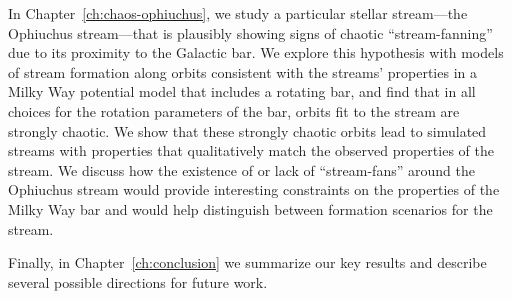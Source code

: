 In Chapter~\ref{ch:chaos-ophiuchus}, we study a particular stellar stream---the
Ophiuchus stream---that is plausibly showing signs of chaotic ``stream-fanning''
due to its proximity to the Galactic bar. We explore this hypothesis with models
of stream formation along orbits consistent with the streams' properties in a
Milky Way potential model that includes a rotating bar, and find that in all
choices for the rotation parameters of the bar, orbits fit to the stream are
strongly chaotic. We show that these strongly chaotic orbits lead to simulated
streams with properties that  qualitatively match the observed properties of the
stream. We discuss how the existence of or lack of ``stream-fans'' around the
Ophiuchus stream would provide interesting constraints on the properties of the
Milky Way bar and would help distinguish between formation scenarios for the
stream.

Finally, in Chapter~\ref{ch:conclusion} we summarize our key results and
describe several possible directions for future work.
